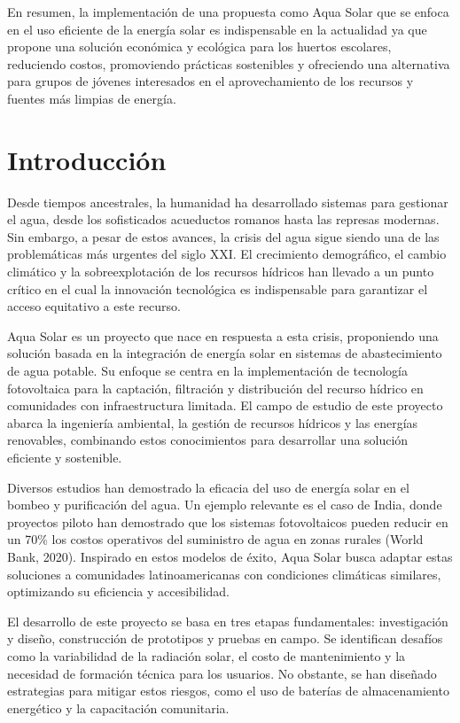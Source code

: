 \documentclass[12pt]{article}
\begin{document}
En resumen, la implementación de una propuesta como Aqua Solar que se enfoca en el uso eficiente de la energía solar es indispensable en la actualidad ya que propone una solución económica y ecológica para los huertos escolares, reduciendo costos, promoviendo prácticas sostenibles y ofreciendo una alternativa para grupos de jóvenes interesados en el aprovechamiento de los recursos y fuentes más limpias de energía.


\newpage
\section{Introducción}
Desde tiempos ancestrales, la humanidad ha desarrollado sistemas para gestionar el agua, desde los sofisticados acueductos romanos hasta las represas modernas. Sin embargo, a pesar de estos avances, la crisis del agua sigue siendo una de las problemáticas más urgentes del siglo XXI. El crecimiento demográfico, el cambio climático y la sobreexplotación de los recursos hídricos han llevado a un punto crítico en el cual la innovación tecnológica es indispensable para garantizar el acceso equitativo a este recurso.

Aqua Solar es un proyecto que nace en respuesta a esta crisis, proponiendo una solución basada en la integración de energía solar en sistemas de abastecimiento de agua potable. Su enfoque se centra en la implementación de tecnología fotovoltaica para la captación, filtración y distribución del recurso hídrico en comunidades con infraestructura limitada. El campo de estudio de este proyecto abarca la ingeniería ambiental, la gestión de recursos hídricos y las energías renovables, combinando estos conocimientos para desarrollar una solución eficiente y sostenible.

Diversos estudios han demostrado la eficacia del uso de energía solar en el bombeo y purificación del agua. Un ejemplo relevante es el caso de India, donde proyectos piloto han demostrado que los sistemas fotovoltaicos pueden reducir en un 70\% los costos operativos del suministro de agua en zonas rurales (World Bank, 2020). Inspirado en estos modelos de éxito, Aqua Solar busca adaptar estas soluciones a comunidades latinoamericanas con condiciones climáticas similares, optimizando su eficiencia y accesibilidad.

El desarrollo de este proyecto se basa en tres etapas fundamentales: investigación y diseño, construcción de prototipos y pruebas en campo. Se identifican desafíos como la variabilidad de la radiación solar, el costo de mantenimiento y la necesidad de formación técnica para los usuarios. No obstante, se han diseñado estrategias para mitigar estos riesgos, como el uso de baterías de almacenamiento energético y la capacitación comunitaria.
\newpage
\end{document}
